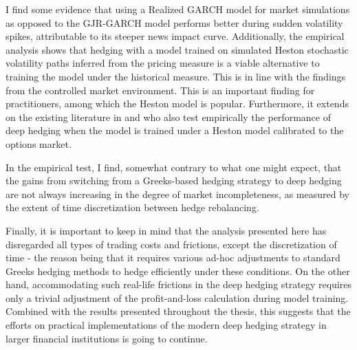 I find some evidence that using a Realized GARCH model for market simulations as opposed to the GJR-GARCH model performs better during sudden volatility spikes, attributable to its steeper news impact curve. Additionally, the empirical analysis shows that hedging with a model trained on simulated Heston stochastic volatility paths inferred from the pricing measure is a viable alternative to training the model under the historical measure. This is in line with the findings from the controlled market environment. This is an important finding for practitioners, among which the Heston model is popular. Furthermore, it extends on the existing literature in \cite{giurca2021delta} and \cite{mikkila2021empirical} who also test empirically the performance of deep hedging when the model is trained under a Heston model calibrated to the options market.

In the empirical test, I find, somewhat contrary to what one might expect, that the gains from switching from a Greeks-based hedging strategy to deep hedging are not always increasing in the degree of market incompleteness, as measured by the extent of time discretization between hedge rebalancing. 

Finally, it is important to keep in mind that the analysis presented here has disregarded all types of trading costs and frictions, except the discretization of time - the reason being that it requires various ad-hoc adjustments to standard Greeks hedging methods to hedge efficiently under these conditions. On the other hand, accommodating such real-life frictions in the deep hedging strategy requires only a trivial adjustment of the profit-and-loss calculation during model training. Combined with the results presented throughout the thesis, this suggests that the efforts on practical implementations of the modern deep hedging strategy in larger financial institutions is going to continue.

